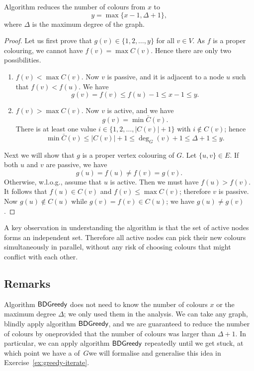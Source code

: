\begin{lemma}
    Algorithm  reduces the number of colours from $x$ to
    \[
        y = \max \{ x-1, \Delta+1 \},
    \]
    where $\Delta$ is the maximum degree of the graph.
\end{lemma}
\begin{proof}
    Let us first prove that $g(v) \in \{1,2,\dotsc,y\}$ for all $v \in V$. As $f$ is a proper colouring, we cannot have $f(v) = \max C(v)$. Hence there are only two possibilities.
    \begin{enumerate}
        \item $f(v) < \max C(v)$. Now $v$ is passive, and it is adjacent to a node $u$ such that $f(v) < f(u)$. We have
        \[
            g(v) = f(v) \le f(u) - 1 \le x - 1 \le y.
        \]
        \item $f(v) > \max C(v)$. Now $v$ is active, and we have
        \[
            g(v) = \min \bar{C}(v).
        \]
        There is at least one value $i \in \{1,2,\dotsc,|C(v)|+1\}$ with $i \notin C(v)$; hence
        \[
            \min \bar{C}(v) \le |C(v)| + 1 \le \deg_G(v) + 1 \le \Delta + 1 \le y.
        \]
    \end{enumerate}
    
    Next we will show that $g$ is a proper vertex colouring of $G$. Let $\{u,v\} \in E$. If both $u$ and $v$ are passive, we have
    \[
        g(u) = f(u) \ne f(v) = g(v).
    \]
    Otherwise, w.l.o.g., assume that $u$ is active. Then we must have $f(u) > f(v)$. It follows that $f(u) \in C(v)$ and $f(v) \le \max C(v)$; therefore $v$ is passive. Now
    $g(u) \notin C(u)$ while
    $g(v) = f(v) \in C(u)$; we have $g(u) \ne g(v)$.
\end{proof}

A key observation in understanding the algorithm is that the set of active nodes forms an independent set. Therefore all active nodes can pick their new colours simultaneously in parallel, without any risk of choosing colours that might conflict with each other.

\subsection{Remarks}

Algorithm $\textsf{BDGreedy}$ does not need to know the number of colours $x$ or the maximum degree $\Delta$; we only used them in the analysis. We can take any graph, blindly apply algorithm $\textsf{BDGreedy}$, and we are guaranteed to reduce the number of colours by one\mydash provided that the number of colours was larger than $\Delta + 1$. In particular, we can apply algorithm $\textsf{BDGreedy}$ repeatedly until we get stuck, at which point we have a \Dpocol{} of~$G$\mydash we will formalise and generalise this idea in Exercise~\ref{ex:greedy-iterate}.


